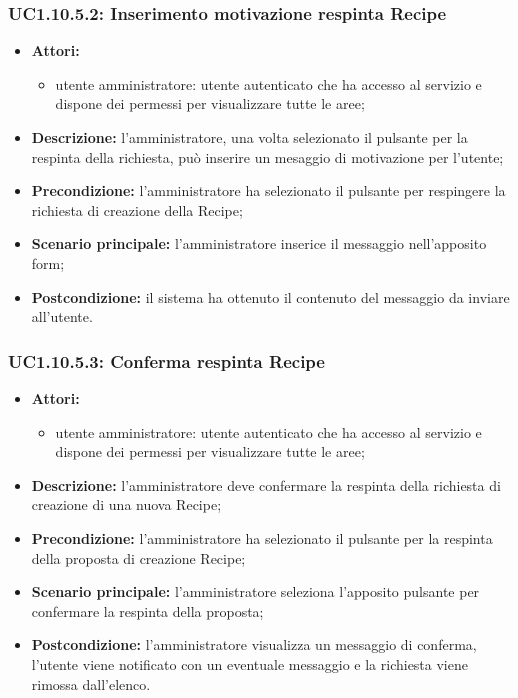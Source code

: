 \subsubsection{UC1.10.5.2: Inserimento motivazione respinta Recipe}
\begin{itemize}
	\item \textbf{Attori:}
	\begin{itemize}
		\item utente amministratore: utente autenticato che ha accesso al servizio e dispone dei permessi per visualizzare tutte le aree;
	\end{itemize}
	\item \textbf{Descrizione:} l'amministratore, una volta selezionato il pulsante per la respinta della richiesta, può inserire un mesaggio di motivazione per l'utente;
	\item \textbf{Precondizione:} l'amministratore ha selezionato il pulsante per respingere la richiesta di creazione della Recipe;
	\item \textbf{Scenario principale:} l'amministratore inserice il messaggio nell'apposito form;
	\item \textbf{Postcondizione:} il sistema ha ottenuto il contenuto del messaggio da inviare all'utente.
\end{itemize}

\subsubsection{UC1.10.5.3: Conferma respinta Recipe}
	\begin{itemize}
		\item \textbf{Attori:}
		\begin{itemize}
			\item utente amministratore: utente autenticato che ha accesso al servizio e dispone dei permessi per visualizzare tutte le aree;
		\end{itemize}
		\item \textbf{Descrizione:} l'amministratore deve confermare la respinta della richiesta di creazione di una nuova Recipe;
		\item \textbf{Precondizione:} l'amministratore ha selezionato il pulsante per la respinta della proposta di creazione Recipe;
		\item \textbf{Scenario principale:} l'amministratore seleziona l'apposito pulsante per confermare la respinta della proposta;
		\item \textbf{Postcondizione:} l'amministratore visualizza un messaggio di conferma, l'utente viene notificato con un eventuale messaggio e la richiesta viene rimossa dall'elenco.
	\end{itemize}

